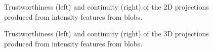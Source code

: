 \clearpage
\begin{figure}[H]
	\centering
	\caption{Trustworthiness (left) and continuity (right) of the 2D projections produced from intensity features from blobs.}\label{fig:TC_2d_intensity}
\end{figure}

\begin{figure}[H]
	\centering
	\caption{Trustworthiness (left) and continuity (right) of the 3D projections produced from intensity features from blobs.}\label{fig:TC_3d_intensity}
\end{figure}

